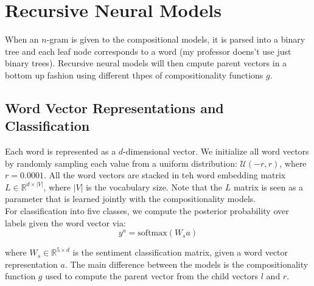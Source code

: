 \section{Recursive Neural Models}

When an $n$-gram is given to the compositional models, it is parsed into a
binary tree and each leaf node corresponds to a word (my professor doens't use 
just binary trees). Recursive neural models will then cmpute parent vectors in a
bottom up fashion using different thpes of compositionality functions $g$.

\subsection{Word Vector Representations and Classification}

Each word is represented as a $d$-dimensional vector. We initialize all word
vectors by randomly sampling each value from a uniform distribution:
$\mathcal{U}(-r, r)$, where $r=0.0001$. All the word vectors are stacked in teh
word embedding matrix $L \in \mathbb{R}^{d \times |V|}$, where $|V|$ is the
vocabulary size. Note that the $L$ matrix is seen as a parameter that is learned
jointly with the compositionality models.\\

For classification into five classes, we compute the posterior probability over
labels given the word vector via:
\begin{equation}
	y^a = \text{softmax}(W_s a)
\end{equation}

where $W_s \in \mathbb{R}^{5 \times d}$ is the sentiment classification matrix,
given a word vector representation $a$. The main difference between the
models is the compositionality function $g$ used to compute the parent vector
from the child vectors $l$ and $r$.
